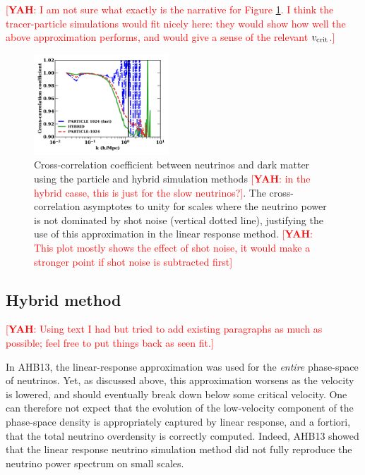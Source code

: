 \documentclass[useAMS, usenatbib]{mnras}
\newcommand{\yah}[1]{{\textcolor{red}{[{\bf YAH}: #1]}}}
\begin{document}
\yah{I am not sure what exactly is the narrative for Figure \ref{fig:cross-corr}. I think the tracer-particle simulations would fit nicely here: they would show how well the above approximation performs, and would give a sense of the relevant $v_{\rm crit}$.}

\begin{figure}
\includegraphics[width=0.45\textwidth]{nuplots/corr_coeff-1.pdf}
  \caption{Cross-correlation coefficient between neutrinos and dark matter using the particle and hybrid simulation methods \yah{in the hybrid casse, this is just for the slow neutrinos?}.
  The cross-correlation asymptotes to unity for scales where the neutrino power is not dominated by shot noise (vertical dotted line), justifying the use of this approximation in the linear response method. \yah{This plot mostly shows the effect of shot noise, it would make a stronger point if shot noise is subtracted first}}
  \label{fig:cross-corr}
\end{figure}

\subsection{Hybrid method} \label{sec:hybrid}

\yah{Using text I had but tried to add existing paragraphs as much as possible; feel free to put things back as seen fit.}

In AHB13, the linear-response approximation was used for the \emph{entire} phase-space of neutrinos. Yet, as discussed above, this approximation worsens as the velocity is lowered, and should eventually break down below some critical velocity. One can therefore not expect that the evolution of the low-velocity component of the phase-space density is appropriately captured by linear response, and a fortiori, that the total neutrino overdensity is correctly computed. Indeed, AHB13 showed that the linear response neutrino simulation method did not fully reproduce the neutrino power spectrum on small scales.
\end{document}
